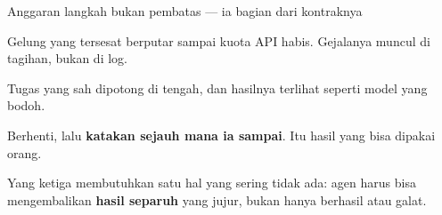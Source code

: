 \documentclass[aspectratio=169,11pt,t]{beamer}
\begin{document}
\begin{frame}[shrink=25]{Anggaran langkah bukan pembatas --- ia bagian dari kontraknya}
\begin{minipage}[t]{0.3253\textwidth}
\begin{icardbad}
Gelung yang tersesat berputar sampai kuota API habis. Gejalanya muncul di tagihan, bukan di log.
\end{icardbad}
\end{minipage}%
\hfill
\begin{minipage}[t]{0.3253\textwidth}
\begin{icardwarn}
Tugas yang sah dipotong di tengah, dan hasilnya terlihat seperti model yang bodoh.
\end{icardwarn}
\end{minipage}%
\hfill
\begin{minipage}[t]{0.3253\textwidth}
\begin{icardgood}
Berhenti, lalu \textbf{katakan sejauh mana ia sampai}. Itu hasil yang bisa dipakai orang.
\end{icardgood}
\end{minipage}%
{\fontsize{9.4}{12.6}\selectfont\color{fg2}Yang ketiga membutuhkan satu hal yang sering tidak ada: agen harus bisa mengembalikan \textbf{hasil separuh} yang jujur, bukan hanya berhasil atau galat.\par}\vskip 4pt
\end{frame}
\end{document}
